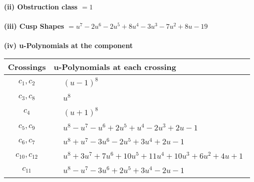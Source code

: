 \documentclass[1p]{elsarticle_modified}
\theoremstyle{definition}
\begin{document}
\flushleft \textbf{(ii) Obstruction class $= 1$}\\~\\
\flushleft \textbf{(iii) Cusp Shapes $= u^7-2 u^6-2 u^5+8 u^4-3 u^3-7 u^2+8 u-19$}\\~\\
\newpage\renewcommand{\arraystretch}{1}
\flushleft \textbf{(iv) u-Polynomials at the component}\newline \\
\begin{tabular}{m{50pt}|m{274pt}}
Crossings & \hspace{64pt}u-Polynomials at each crossing \\
\hline $$\begin{aligned}c_{1},c_{2}\end{aligned}$$&$\begin{aligned}
&(u-1)^8
\end{aligned}$\\
\hline $$\begin{aligned}c_{3},c_{8}\end{aligned}$$&$\begin{aligned}
&u^8
\end{aligned}$\\
\hline $$\begin{aligned}c_{4}\end{aligned}$$&$\begin{aligned}
&(u+1)^8
\end{aligned}$\\
\hline $$\begin{aligned}c_{5},c_{9}\end{aligned}$$&$\begin{aligned}
&u^8- u^7- u^6+2 u^5+u^4-2 u^3+2 u-1
\end{aligned}$\\
\hline $$\begin{aligned}c_{6},c_{7}\end{aligned}$$&$\begin{aligned}
&u^8+u^7-3 u^6-2 u^5+3 u^4+2 u-1
\end{aligned}$\\
\hline $$\begin{aligned}c_{10},c_{12}\end{aligned}$$&$\begin{aligned}
&u^8+3 u^7+7 u^6+10 u^5+11 u^4+10 u^3+6 u^2+4 u+1
\end{aligned}$\\
\hline $$\begin{aligned}c_{11}\end{aligned}$$&$\begin{aligned}
&u^8- u^7-3 u^6+2 u^5+3 u^4-2 u-1
\end{aligned}$\\
\hline
\end{tabular}\\~\\
\end{document}
